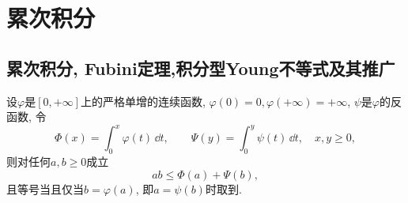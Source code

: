\section{累次积分}
\subsection{累次积分, Fubini定理,积分型Young不等式及其推广}
\begin{theorem}[Young不等式]\label{Th:young}
设\(\varphi\)是\(\left[0,+\infty\right]\)上的严格单增的连续函数, 
\(\varphi(0)=0,\varphi(+\infty)=+\infty\), \(\psi\)是\(\varphi\)的反函数, 令
\[\varPhi(x)=\int_0^x\varphi(t)\,\dd t,\qquad\varPsi(y)=\int_{0}^{y}\psi(t)\,\dd t,\quad x,y\geqslant 0,\]
则对任何\(a,b\geqslant 0\)成立\[ab\leqslant\varPhi(a)+\varPsi(b),\]
且等号当且仅当\(b=\varphi(a)\), 即\(a=\psi(b)\)时取到.
\end{theorem}
